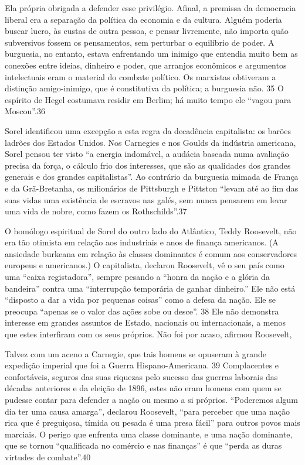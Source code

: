  \par 
Ela própria obrigada a defender esse privilégio. Afinal, a premissa da democracia liberal era a separação da política da economia e da cultura. Alguém poderia buscar lucro, às custas de outra pessoa, e pensar livremente, não importa quão subversivos fossem os pensamentos, sem perturbar o equilíbrio de poder. A burguesia, no entanto, estava enfrentando um inimigo que entendia muito bem as conexões entre ideias, dinheiro e poder, que arranjos econômicos e argumentos intelectuais eram o material do combate político. Os marxistas obtiveram a distinção amigo-inimigo, que é constitutiva da política; a burguesia não. {\color{blue}35} O espírito de Hegel costumava residir em Berlim; há muito tempo ele “vagou para Moscou”.{\color{blue}36}
 \par 
Sorel identificou uma excepção a esta regra da decadência capitalista: os barões ladrões dos Estados Unidos. Nos Carnegies e nos Goulds da indústria americana, Sorel pensou ter visto “a energia indomável, a audácia baseada numa avaliação precisa da força, o cálculo frio dos interesses, que são as qualidades dos grandes generais e dos grandes capitalistas”. Ao contrário da burguesia mimada de França e da Grã-Bretanha, os milionários de Pittsburgh e Pittston “levam até ao fim das suas vidas uma existência de escravos nas galés, sem nunca pensarem em levar uma vida de nobre, como fazem os Rothschilds”.{\color{blue}37}
 \par 
O homólogo espiritual de Sorel do outro lado do Atlântico, Teddy Roosevelt, não era tão otimista em relação aos industriais e anos de finança americanos. (A ansiedade burkeana em relação às classes dominantes é comum aos conservadores europeus e americanos.) O capitalista, declarou Roosevelt, vê o seu país como uma “caixa registadora”, sempre pesando a “honra da nação e a glória da bandeira” contra uma “interrupção temporária de ganhar dinheiro.” Ele não está “disposto a dar a vida por pequenas coisas” como a defesa da nação. Ele se preocupa “apenas se o valor das ações sobe ou desce”. {\color{blue}38} Ele não demonstra interesse em grandes assuntos de Estado, nacionais ou internacionais, a menos que estes interfiram com os seus próprios. Não foi por acaso, afirmou Roosevelt,
 \par 
Talvez com um aceno a Carnegie, que tais homens se opuseram à grande expedição imperial que foi a Guerra Hispano-Americana. {\color{blue}39} Complacentes e confortáveis, seguros das suas riquezas pelo sucesso das guerras laborais das décadas anteriores e da eleição de 1896, estes não eram homens com quem se pudesse contar para defender a nação ou mesmo a si próprios. “Poderemos algum dia ter uma causa amarga”, declarou Roosevelt, “para perceber que uma nação rica que é preguiçosa, tímida ou pesada é uma presa fácil” para outros povos mais marciais. O perigo que enfrenta uma classe dominante, e uma nação dominante, que se tornou “qualificada no comércio e nas finanças” é que “perda as duras virtudes de combate”.{\color{blue}40}
